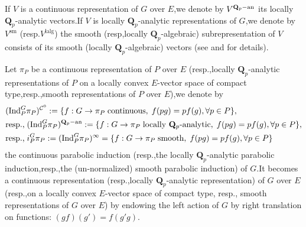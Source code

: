 \documentclass[SecEq,CM,GP]{degruyter-crelle} %
\theoremstyle{plain}
\newcommand{\ana}{{\rm an}}
\newcommand{\bQ}{{\mathbf{Q}}}
\newcommand{\cC}{\mathcal C}
\begin{document}
If $V$ is a continuous representation of $G$ over $E$,\;we denote by $V^{\bQ_p-\ana}$ its locally $\bQ_p$-analytic vectors.\;If $V$ is
locally $\bQ_p$-analytic representations of $G$,\;we denote by $V^{\mathrm{sm}}$ (resp.\;$V^{\mathrm{lalg}}$) the smooth (resp,\;locally $\bQ_p$-algebraic) subrepresentation of $V$ consists of its smooth (locally $\bQ_p$-algebraic) vectors (see \cite{schneider2002banach} and \cite{Emerton2007summary} for details).\;


Let $\pi_P$ be a continuous representation of $P$ over $E$ (resp.,\;locally $\bQ_p$-analytic representations of $P$ on a locally convex $E$-vector space of compact type,\;resp.,\;smooth representations of $P$ over $E$),\;we denote by
\begin{equation}\label{smoothadj2}
\begin{aligned}
	&(\mathrm{Ind}_{P}^{G}\pi_P)^{\cC^0}:=\{f:G\rightarrow \pi_P \text{\;continuous},\;f(pg)=pf(g),\forall p\in P\},\\
	&\text{resp.,\;}(\mathrm{Ind}_{P}^{G}\pi_P)^{\bQ_p-\ana}:=\{f:G\rightarrow \pi_P \text{\;locally $\bQ_p$-analytic},\;f(pg)=pf(g),\forall p\in P\},\\
	&\text{resp.,\;}i^G_P\pi_P:=(\mathrm{Ind}_{P}^{G}\pi_P)^{\infty}=\{f:G\rightarrow \pi_P \text{\;smooth},\;f(pg)=pf(g),\forall p\in P\}
\end{aligned}
\end{equation}
the continuous parabolic induction (resp.,\;the locally $\bQ_p$-analytic parabolic induction,\;resp.,\;the (un-normalized) smooth parabolic induction) of $G$.\;It becomes a continuous representation (resp.,\;locally $\bQ_p$-analytic  representation) of $G$ over $E$ (resp.,\;on a locally convex $E$-vector space of compact type, resp., smooth representations of $G$ over $E$) by endowing the left action of $G$ by right translation on functions: $(gf)(g')=f(g'g)$.\;


\end{document}
